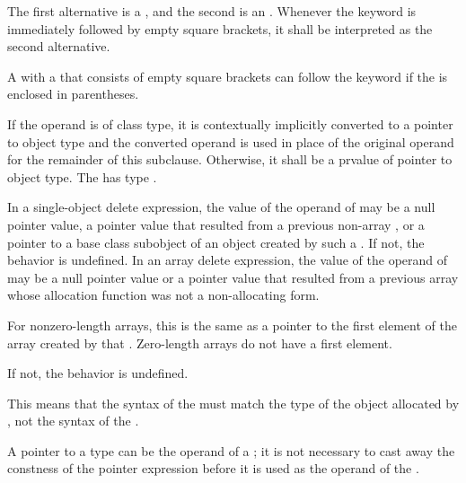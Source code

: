 The first alternative is a
, and the
second is an .
Whenever the  keyword is immediately followed by empty square
brackets, it shall be interpreted as the second alternative.
\begin{footnote}
A
 with a 
that consists of empty square brackets can follow the  keyword
if the  is enclosed in parentheses.
\end{footnote}
If the operand is of
class type, it is contextually implicitly converted
to a pointer to object
type
and the converted operand is used in place of the original operand
for the remainder of this subclause.
Otherwise, it shall be a prvalue of pointer to object type.
The  has type
.

\pnum
{}%
In a single-object delete expression, the value of the operand of
 may be a null pointer value,
a pointer value
that resulted from a previous non-array , or
a pointer to a base class subobject
of an object created by such a .
If not, the behavior is undefined.
%
In an array delete expression, the value of the operand of 
may be a null pointer value or a pointer value that resulted from
a previous array  whose
allocation function was not a non-allocating form.
\begin{footnote}
For nonzero-length
arrays, this is the same as a pointer to the first
element of the array created by that .
Zero-length arrays do not have a first element.
\end{footnote}
If not, the behavior is undefined.
\begin{note}
This means that the syntax of the  must
match the type of the object allocated by , not the syntax of the
.
\end{note}
\begin{note}
A pointer to a  type can be the operand of a
; it is not necessary to cast away the
constness of the pointer expression before it is
used as the operand of the .
\end{note}

